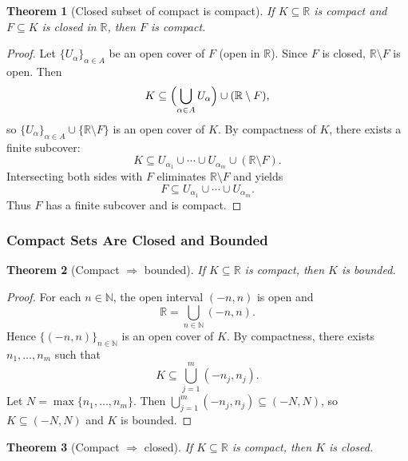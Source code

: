 \documentclass[12pt]{article}
\numberwithin{equation}{section}
\newcommand{\RR}{\mathbb{R}}
\newcommand{\NN}{\mathbb{N}}
\theoremstyle{plain}
\newtheorem{theorem}{Theorem}[section]
\theoremstyle{definition}
\theoremstyle{remark}
\begin{document}
\begin{theorem}[Closed subset of compact is compact]\label{thm:closed-subset-compact}
If $K\subseteq\RR$ is compact and $F\subseteq K$ is closed in $\RR$, then $F$ is compact.
\end{theorem}

\begin{proof}
Let $\{U_\alpha\}_{\alpha\in A}$ be an open cover of $F$ (open in $\RR$).
Since $F$ is closed, $\RR\setminus F$ is open. Then
\[
K \subseteq \Bigl(\bigcup_{\alpha\in A} U_\alpha\Bigr)\cup (\RR\setminus F),
\]
so $\{U_\alpha\}_{\alpha\in A}\cup\{\RR\setminus F\}$ is an open cover of $K$.
By compactness of $K$, there exists a finite subcover:
\[
K \subseteq U_{\alpha_1}\cup\cdots\cup U_{\alpha_m}\cup(\RR\setminus F).
\]
Intersecting both sides with $F$ eliminates $\RR\setminus F$ and yields
\[
F \subseteq U_{\alpha_1}\cup\cdots\cup U_{\alpha_m}.
\]
Thus $F$ has a finite subcover and is compact.
\end{proof}

\subsubsection{Compact Sets Are Closed and Bounded}

\begin{theorem}[Compact $\Rightarrow$ bounded]\label{thm:compact-bounded}
If $K\subseteq\RR$ is compact, then $K$ is bounded.
\end{theorem}

\begin{proof}
For each $n\in\NN$, the open interval $(-n,n)$ is open and
\[
\RR = \bigcup_{n\in\NN} (-n,n).
\]
Hence $\{(-n,n)\}_{n\in\NN}$ is an open cover of $K$.
By compactness, there exists $n_1,\dots,n_m$ such that
\[
K \subseteq \bigcup_{j=1}^m (-n_j,n_j).
\]
Let $N=\max\{n_1,\dots,n_m\}$. Then $\bigcup_{j=1}^m (-n_j,n_j)\subseteq (-N,N)$, so $K\subseteq (-N,N)$ and $K$ is bounded.
\end{proof}

\begin{theorem}[Compact $\Rightarrow$ closed]\label{thm:compact-closed}
If $K\subseteq\RR$ is compact, then $K$ is closed.
\end{theorem}
\end{document}
